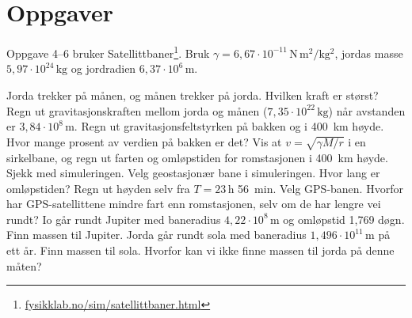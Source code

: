 \documentclass[11pt]{article}
\begin{document}

\section*{Oppgaver}

Oppgave 4–6 bruker Satellittbaner\footnote{\url{fysikklab.no/sim/satellittbaner.html}}. Bruk $γ = 6{,}67 \cdot 10^{-11}\,\mathrm{N\,m^{2}/kg^{2}}$, jordas masse $5{,}97 \cdot 10^{24}\,\mathrm{kg}$ og jordradien $6{,}37 \cdot 10^{6}\,\mathrm{m}$.

\begin{oppgaveliste}
\oppgave {}Jorda trekker på månen, og månen trekker på jorda. Hvilken kraft er størst?
\svar
\oppgave {}Regn ut gravitasjonskraften mellom jorda og månen ($7{,}35 \cdot 10^{22}\,\mathrm{kg}$) når avstanden er $3{,}84 \cdot 10^{8}\,\mathrm{m}$.
\svar
\oppgave {}Regn ut gravitasjonsfeltstyrken på bakken og i 400~km høyde. Hvor mange prosent av verdien på bakken er det?
\svar
\oppgave {}Vis at $v = \sqrt{γM/r}$ i en sirkelbane, og regn ut farten og omløpstiden for romstasjonen i 400~km høyde. Sjekk med simuleringen.
\svar
\oppgave {}Velg geostasjonær bane i simuleringen. Hvor lang er omløpstiden? Regn ut høyden selv fra $T = 23\,\mathrm{h}$ 56~min.
\svar
\oppgave {}Velg GPS-banen. Hvorfor har GPS-satellittene mindre fart enn romstasjonen, selv om de har lengre vei rundt?
\svar
\oppgave {}Io går rundt Jupiter med baneradius $4{,}22 \cdot 10^{8}\,\mathrm{m}$ og omløpstid 1,769 døgn. Finn massen til Jupiter.
\svar
\oppgave {}Jorda går rundt sola med baneradius $1{,}496 \cdot 10^{11}\,\mathrm{m}$ på ett år. Finn massen til sola. Hvorfor kan vi ikke finne massen til jorda på denne måten?
\svar
\end{oppgaveliste}
\end{document}
